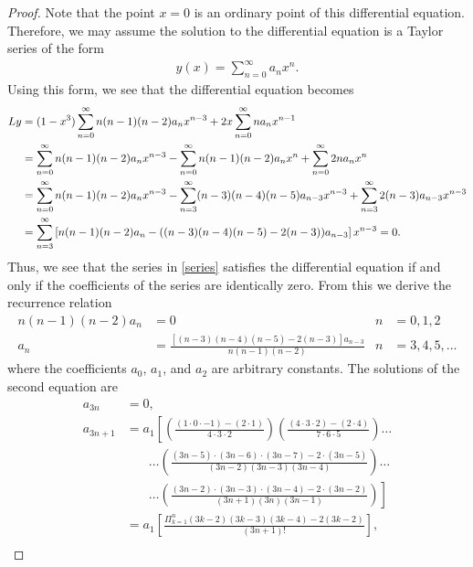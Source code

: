 \documentclass[12pt]{article}
\theoremstyle{definition}
\begin{document}
\begin{proof}
  Note that the point $x=0$ is an ordinary point of this differential equation. Therefore, we may assume the solution to the differential
  equation is a Taylor series of the form
  \begin{align*}
    y(x) = \sum_{n=0}^\infty a_n x^n.
  \end{align*}
  Using this form, we see that the differential equation becomes
  \begin{align}\label{series}
    Ly &= (1-x^3)\sum_{n=0}^\infty n(n-1)(n-2) a_n x^{n-3} + 2x \sum_{n=0}^\infty n a_n x^{n-1} \notag \\
    &= \sum_{n=0}^\infty n(n-1)(n-2) a_n x^{n-3} - \sum_{n=0}^\infty n(n-1)(n-2) a_n x^{n} + \sum_{n=0}^\infty 2n a_n x^{n} \notag \\
    &= \sum_{n=0}^\infty n(n-1)(n-2) a_n x^{n-3} - \sum_{n=3}^\infty (n-3)(n-4)(n-5) a_{n-3} x^{n-3} + \sum_{n=3}^\infty 2(n-3) a_{n-3} x^{n-3} \notag \\
    &= \sum_{n=3}^\infty \left[n(n-1)(n-2) a_n - ((n-3)(n-4)(n-5) - 2(n-3)) a_{n-3}\right] x^{n-3} = 0.
  \end{align}
  Thus, we see that the series in \eqref{series} satisfies the differential equation
  if and only if the coefficients of the series are identically zero. From this we derive the recurrence relation
  \begin{align*}
      n(n-1)(n-2)a_{n} &= 0 &n &=0,1,2 \\
      a_{n} &= \frac{\left[(n-3)(n-4)(n-5) - 2(n-3)\right]a_{n-3}}{n(n-1)(n-2)} &n &= 3,4,5,\dots
  \end{align*}
  where the coefficients $a_0$, $a_1$, and $a_2$ are arbitrary constants. The solutions
  of the second equation are
  \begin{align*}
    a_{3n} &= 0, \\
    a_{3n+1} &= a_1\left[\left(\frac{(1\cdot 0\cdot -1) - (2\cdot1)}{4\cdot 3\cdot 2}\right)\left(\frac{(4\cdot 3\cdot 2) - (2\cdot4)}{7\cdot 6\cdot 5}\right)\dots\right. \\
    &\phantom{=}\ \ \dots\left(\frac{(3n-5)\cdot (3n-6)\cdot (3n-7) - 2\cdot(3n-5)}{(3n-2)(3n-3)(3n-4)}\right)\dots \\
    &\phantom{=}\ \ \left.\dots\left(\frac{(3n-2)\cdot (3n-3)\cdot (3n-4) - 2\cdot(3n-2)}{(3n+1)(3n)(3n-1)}\right)\right] \\
    &= a_1\left[\frac{\Pi_{k=1}^{n} (3k-2)(3k-3)(3k-4) - 2(3k-2)}{(3n+1)!}\right],\\
  \end{align*}

\end{proof}
\end{document}
